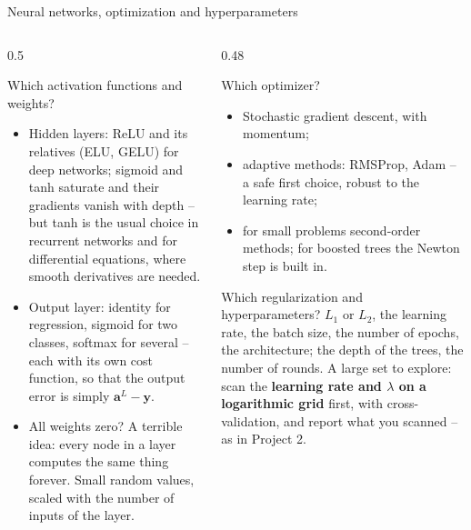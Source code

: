 \documentclass[10pt,aspectratio=169]{beamer}
\begin{document}
\begin{frame}{Neural networks, optimization and hyperparameters}
\begin{columns}[T]
\begin{column}{0.5\textwidth}
\small
\begin{block}{Which activation functions and weights?}
\footnotesize
\begin{itemize}
  \item Hidden layers: ReLU and its relatives (ELU, GELU) for deep
    networks; sigmoid and tanh saturate and their gradients vanish with
    depth -- but tanh is the usual choice in recurrent networks and for
    differential equations, where smooth derivatives are needed.
  \item Output layer: identity for regression, sigmoid for two classes,
    softmax for several -- each with its own cost function, so that the
    output error is simply $\bm{a}^L-\bm{y}$.
  \item All weights zero?  A terrible idea: every node in a layer computes
    the same thing forever.  Small random values, scaled with the number of
    inputs of the layer.
\end{itemize}
\end{block}
\end{column}
\begin{column}{0.48\textwidth}
\small
\begin{block}{Which optimizer?}
\footnotesize
\begin{itemize}
  \item Stochastic gradient descent, with momentum;
  \item adaptive methods: RMSProp, Adam -- a safe first choice, robust to
    the learning rate;
  \item for small problems second-order methods; for boosted trees the
    Newton step is built in.
\end{itemize}
\end{block}
\begin{block}{Which regularization and hyperparameters?}
\footnotesize
$L_1$ or $L_2$, the learning rate, the batch size, the number of epochs,
the architecture; the depth of the trees, the number of rounds.  A large
set to explore: scan the \textbf{learning rate and $\lambda$ on a
logarithmic grid} first, with cross-validation, and report what you
scanned -- as in Project 2.
\end{block}
\end{column}
\end{columns}
\end{frame}
\end{document}
